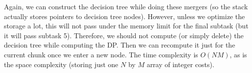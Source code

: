 \documentclass[12pt]{article}
\begin{document}
Again, we can construct the decision tree while doing these mergers (so the stack actually stores pointers to decision tree nodes). However, unless we optimize the storage a lot, this will not pass under the memory limit for the final subtask (but it will pass subtask 5). Therefore, we should not compute (or simply delete) the decision tree while computing the DP. Then we can recompute it just for the current chunk once we enter a new node. The time complexity is $O(NM)$, as is the space complexity (storing just one $N$ by $M$ array of integer costs).
\end{document}
